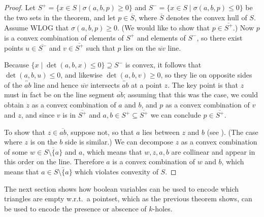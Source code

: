 \begin{proof}
    Let $S^+=\{x\in S\mid \sigma(a,b,p)\ge 0\}$ and $S^-=\{x\in S\mid \sigma(a,b,p)\le 0\}$ be the two sets in the theorem, and let $p\in \overline{S}$, where $\overline{S}$ denotes the convex hull of $S$. Assume WLOG that $\sigma(a,b,p)\ge 0$. (We would like to show that $p\in \overline{S^+}$.) Now $p$ is a convex combination of elements of $S^+$ and elements of $S^-$, so there exist points $u\in \overline{S^-}$ and $v\in \overline{S^+}$ such that $p$ lies on the $\overline{uv}$ line.

    Because $\{x\mid \det(a,b,x)\le 0\}\supseteq S^-$ is convex, it follows that $\det(a,b,u)\le 0$, and likewise $\det(a,b,v)\ge 0$, so they lie on opposite sides of the $\overleftrightarrow{ab}$ line and hence $\overline{uv}$ intersects $\overleftrightarrow{ab}$ at a point $z$. The key point is that $z$ must in fact be on the line segment $\overline{ab}$; assuming that this was the case, we could obtain $z$ as a convex combination of $a$ and $b$, and $p$ as a convex combination of $v$ and $z$, and since $v$ is in $\overline{S^+}$ and $a,b\in S^+\subseteq\overline{S^+}$ we can conclude $p\in \overline{S^+}$.

    To show that $z\in \overline{ab}$, suppose not, so that $a$ lies between $z$ and $b$ (see ). (The case where $z$ is on the $b$ side is similar.) We can decompose $z$ as a convex combination of some $w\in \overline{S\setminus\{a\}}$ and $a$, which means that $w,z,a,b$ are collinear and appear in this order on the line. Therefore $a$ is a convex combination of $w$ and $b$, which means that $a\in \overline{S\setminus\{a\}}$ which violates convexity of $S$.
\end{proof}

The next section shows how boolean variables can be used to encode which triangles are empty w.r.t.~a pointset, which as the previous theorem shows, can be used to encode the presence or abscence of $k$-holes.




